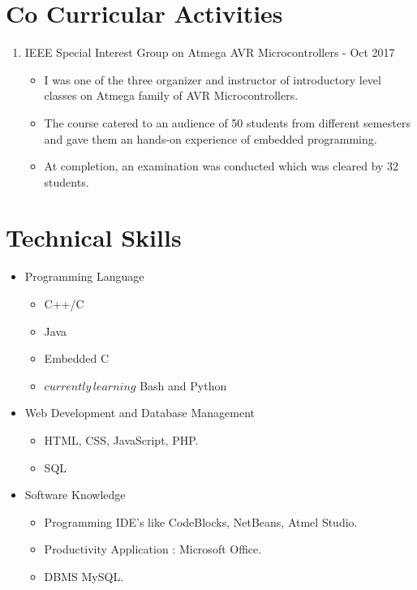 \documentclass[11pt,a4paper,sans]{moderncv}        %
\begin{document}
\section{Co Curricular Activities}
\begin{enumerate}
	\item IEEE Special Interest Group on Atmega AVR Microcontrollers  - Oct 2017
	\begin{itemize}
		\item I was one of the three organizer and instructor of introductory level classes on Atmega family 
		of AVR Microcontrollers.
		\item The course catered to an audience of 50 students from different semesters and gave them an hands-on       experience of embedded programming.
		\item At completion, an examination was conducted which was cleared by 32 students.     
	\end{itemize}
\end{enumerate}

\section{Technical Skills}
 \begin{itemize}
 	\item Programming Language 
 	\begin{itemize}
 		\item C++/C
 		\item Java
 		\item Embedded C
 		\item \(currently\, learning\) Bash and Python
 	\end{itemize}
    \item Web Development and Database Management  
    \begin{itemize}
    	\item HTML, CSS, JavaScript, PHP.
    	\item SQL 
    \end{itemize}
 	\item Software Knowledge 
 	\begin{itemize}
 		\item Programming IDE's like CodeBlocks, NetBeans, Atmel Studio.
 		\item Productivity Application : Microsoft Office.
 		\item DBMS MySQL.
 	\end{itemize}
 \end{itemize}
\end{document}
